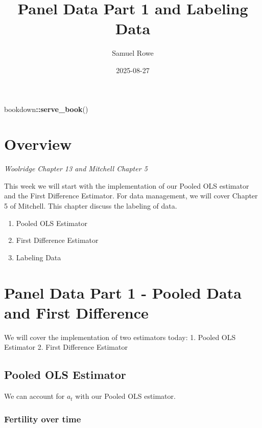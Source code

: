 \documentclass[
]{book}
\title{Panel Data Part 1 and Labeling Data}
\author{Samuel Rowe}
\date{2025-08-27}
\newenvironment{Shaded}{\begin{snugshade}}{\end{snugshade}}
\newcommand{\FunctionTok}[1]{\textcolor[rgb]{0.13,0.29,0.53}{\textbf{#1}}}
\newcommand{\NormalTok}[1]{#1}
\newcommand{\SpecialCharTok}[1]{\textcolor[rgb]{0.81,0.36,0.00}{\textbf{#1}}}
\providecommand{\tightlist}{%
  \setlength{\itemsep}{0pt}\setlength{\parskip}{0pt}}
\begin{document}
\maketitle

{
\setcounter{tocdepth}{1}
\tableofcontents
}
\begin{Shaded}
\begin{Highlighting}[]
\NormalTok{bookdown}\SpecialCharTok{::}\FunctionTok{serve\_book}\NormalTok{()}
\end{Highlighting}
\end{Shaded}

\chapter{Overview}\label{overview}

\emph{Woolridge Chapter 13 and Mitchell Chapter 5}

This week we will start with the implementation of our Pooled OLS estimator and the First Difference Estimator. For data management, we will cover Chapter 5 of Mitchell. This chapter discuss the labeling of data.

\begin{enumerate}
\def\labelenumi{\arabic{enumi}.}
\tightlist
\item
  Pooled OLS Estimator
\item
  First Difference Estimator
\item
  Labeling Data
\end{enumerate}

\chapter{Panel Data Part 1 - Pooled Data and First Difference}\label{panel-data-part-1---pooled-data-and-first-difference}

We will cover the implementation of two estimators today:
1. Pooled OLS Estimator
2. First Difference Estimator

\section{Pooled OLS Estimator}\label{pooled-ols-estimator}

We can account for \(a_t\) with our Pooled OLS estimator.

\subsection{Fertility over time}\label{fertility-over-time}
\end{document}
